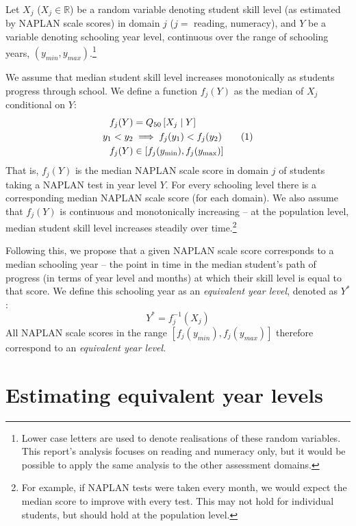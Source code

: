 Let $X_{j}$ ($X_{j} \in \mathbb{R}$) be a random variable denoting student skill level (as estimated by NAPLAN scale scores) in domain ${j}$ ($j = $ reading, numeracy), and $Y$ be a variable denoting schooling year level, continuous over the range of schooling years, $\left(y_{min},y_{max}\right)$.\footnote{Lower case letters are used to denote realisations of these random variables. This report's analysis focuses on reading and numeracy only, but it would be possible to apply the same analysis to the other assessment domains.}

We assume that median student skill level increases monotonically as students progress through school. We define a function $f_{j}(Y)$ as the median of $X_{j}$ conditional on $Y$:
\newcommand\numberthis{\addtocounter{equation}{1}\tag{\theequation}}
\begin{align*}
 f_{j}(Y) &= Q_{50}\left[X_{j} \mid Y\right]  \\ 
 y_1 < y_2 &\implies f_{j}(y_{1}) < f_{j}(y_{2}) \numberthis\label{eq:median} \\ 
 f_{j}(Y) &\in \left[f_{j}(y_{\min}),f_{j}(y_{\max})\right] 
\end{align*}
That is, $f_{j}(Y)$ is the median NAPLAN scale score in domain ${j}$ of students taking a NAPLAN test in year level $Y$. For every schooling level there is a corresponding median NAPLAN scale score (for each domain). We also assume that $f_{j}(Y)$ is continuous and monotonically increasing -- at the population level, median student skill level increases steadily over time.\footnote{For example, if NAPLAN tests were taken every month, we would expect the median score to improve with every test. This may not hold for individual students, but should hold at the population level.}

\newpage
Following this, we propose that a given NAPLAN scale score corresponds to a median schooling year -- the point in time in the median student's path of progress (in terms of year level and months) at which their skill level is equal to that score. We define this schooling year as an \textit{equivalent year level}, denoted as $Y^{*}$:
\begin{equation} Y^{*} = f_{j}^{-1}\left(X_{j}\right) 
\end{equation}
All NAPLAN scale scores in the range $\left[f_{j}(y_{min}),f_{j}(y_{max})\right]$ therefore correspond to an \textit{equivalent year level}.

\section{Estimating equivalent year levels}

